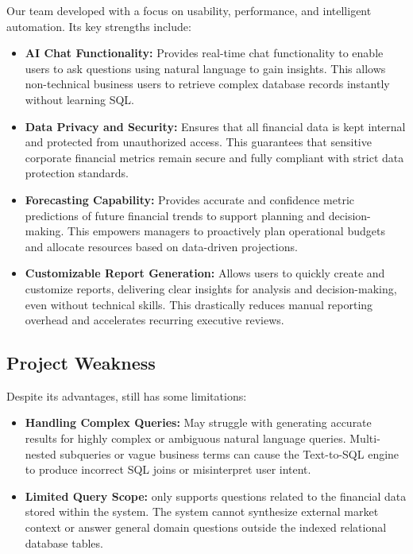 Our team developed \projname{} with a focus on usability, performance,
and intelligent automation. Its key strengths include:

\begin{itemize}
  \item \textbf{AI Chat Functionality:} Provides real-time chat
        functionality to enable users to ask questions using natural
        language to gain insights. This allows non-technical business users
        to retrieve complex database records instantly without learning SQL.
  \item \textbf{Data Privacy and Security:} Ensures that all financial
        data is kept internal and protected from unauthorized access. This
        guarantees that sensitive corporate financial metrics remain secure
        and fully compliant with strict data protection standards.
  \item \textbf{Forecasting Capability:} Provides accurate and
        confidence metric predictions of future financial trends to
        support planning and decision-making. This empowers managers to proactively
        plan operational budgets and allocate resources based on data-driven projections.
  \item \textbf{Customizable Report Generation:} Allows users to quickly
        create and customize reports, delivering clear insights for
        analysis and decision-making, even without technical skills. This drastically
        reduces manual reporting overhead and accelerates recurring executive reviews.
\end{itemize}

\subsection{Project Weakness}
\label{sub:project-weakness}

Despite its advantages, \projname{} still has some limitations:

\begin{itemize}
  \item \textbf{Handling Complex Queries:} May struggle with generating
        accurate results for highly complex or ambiguous natural
        language queries. Multi-nested subqueries or vague business terms can cause the Text-to-SQL engine to produce incorrect SQL joins or misinterpret user intent.
  \item \textbf{Limited Query Scope:} \projname{} only supports
        questions related to the financial data stored within the
        system. The system cannot synthesize external market context or answer general domain questions outside the indexed relational database tables.
\end{itemize}